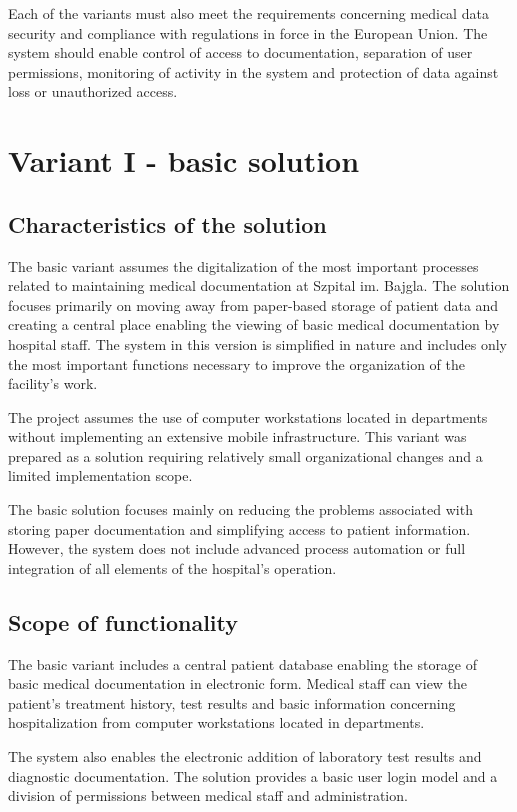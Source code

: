     Each of the variants must also meet the requirements concerning medical data security and compliance with regulations in force in the European Union. The system should enable control of access to documentation, separation of user permissions, monitoring of activity in the system and protection of data against loss or unauthorized access.
    \section{Variant I - basic solution}

    \subsection{Characteristics of the solution}
    The basic variant assumes the digitalization of the most important processes related to maintaining medical documentation at Szpital im. Bajgla. The solution focuses primarily on moving away from paper-based storage of patient data and creating a central place enabling the viewing of basic medical documentation by hospital staff.
    The system in this version is simplified in nature and includes only the most important functions necessary to improve the organization of the facility's work.

    The project assumes the use of computer workstations located in departments without implementing an extensive mobile infrastructure. This variant was prepared as a solution requiring relatively small organizational changes and a limited implementation scope.

    The basic solution focuses mainly on reducing the problems associated with storing paper documentation and simplifying access to patient information. However, the system does not include advanced process automation or full integration of all elements of the hospital's operation.
    \subsection{Scope of functionality}
    The basic variant includes a central patient database enabling the storage of basic medical documentation in electronic form. Medical staff can view the patient's treatment history, test results and basic information concerning hospitalization from computer workstations located in departments.

    The system also enables the electronic addition of laboratory test results and diagnostic documentation. The solution provides a basic user login model and a division of permissions between medical staff and administration.

